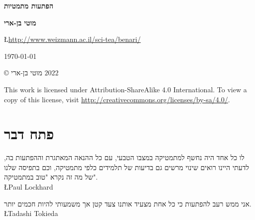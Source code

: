 
\pagestyle{empty}

\begin{center}
\textbf{\Huge הפתעות מתמטיות}
 
\bigskip
\bigskip
\bigskip
\bigskip

\textbf{\Large מוטי בן-ארי}

\bigskip
\bigskip


\L{\url{http://www.weizmann.ac.il/sci-tea/benari/}}

\bigskip
\bigskip

\today{}
\end{center}


\vfill

\begin{center}
\copyright{} מוטי בן-ארי
$2022$
 \end{center}

\begin{english}
\begin{small}
This work is licensed under Attribution-ShareAlike 4.0 International. To view a copy of this license, visit \url{http://creativecommons.org/licenses/by-sa/4.0/}.

\end{small}
\end{english}



\thispagestyle{empty}
\pagestyle{plain}

\chapter*{פתח דבר}
\thispagestyle{empty}

\begin{flushleft}
\parbox{7cm}{
\begin{small}
\begin{flushleft}
לו כל אחד היה נחשף למתמטיקה במצבו הטבעי, עם כל ההנאה המאתגרת וההפתעות בה, לדעתי היינו רואים שינוי מרשים גם בדיעות של תלמידים כלפי מתמטיקה, וכם בתפיסה שלנו של מה זה נקרא "טוב במתמטיקה".\\
\L{Paul Lockhard}

\bigskip

אני ממש רעב להפתעות כי כל אחת מצעיד אותנו צעד קטן אך משמעותי להיות חכמים יותר.\\
\L{Tadashi Tokieda}
\end{flushleft}
\end{small}
}
\end{flushleft}

